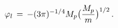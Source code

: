 \begin{equation}
\varphi_l \, = \, - (3 \pi)^{-1/4} M_p \bigl( {{M_p} \over m} \bigr)^{1/2} \, .
\end{equation}

